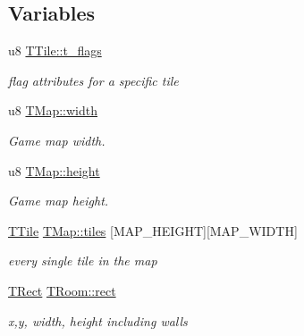 \subsection*{Variables}
\begin{DoxyCompactItemize}
\item 
\mbox{\label{group__GameMap_ga4e29a9a98bfa352440b628a995cba64d}} 
u8 \mbox{\hyperlink{group__GameMap_ga4e29a9a98bfa352440b628a995cba64d}{T\+Tile\+::t\+\_\+flags}}
\begin{DoxyCompactList}\small\item\em flag attributes for a specific tile \end{DoxyCompactList}\item 
\mbox{\label{group__GameMap_ga2fe3dde5db57e2ec58a78ceb85ef1642}} 
u8 \mbox{\hyperlink{group__GameMap_ga2fe3dde5db57e2ec58a78ceb85ef1642}{T\+Map\+::width}}
\begin{DoxyCompactList}\small\item\em Game map width. \end{DoxyCompactList}\item 
\mbox{\label{group__GameMap_ga62f0d660273fafe5b4f27ecc7f95456d}} 
u8 \mbox{\hyperlink{group__GameMap_ga62f0d660273fafe5b4f27ecc7f95456d}{T\+Map\+::height}}
\begin{DoxyCompactList}\small\item\em Game map height. \end{DoxyCompactList}\item 
\mbox{\label{group__GameMap_gac8050f8f059101f93288d8f4037531c9}} 
\mbox{\hyperlink{structTTile}{T\+Tile}} \mbox{\hyperlink{group__GameMap_gac8050f8f059101f93288d8f4037531c9}{T\+Map\+::tiles}} \mbox{[}M\+A\+P\+\_\+\+H\+E\+I\+G\+HT\mbox{]}\mbox{[}M\+A\+P\+\_\+\+W\+I\+D\+TH\mbox{]}
\begin{DoxyCompactList}\small\item\em every single tile in the map \end{DoxyCompactList}\item 
\mbox{\label{group__GameMap_ga637db7778f278eaa8fd09ec009881ae2}} 
\mbox{\hyperlink{structTRect}{T\+Rect}} \mbox{\hyperlink{group__GameMap_ga637db7778f278eaa8fd09ec009881ae2}{T\+Room\+::rect}}
\begin{DoxyCompactList}\small\item\em x,y, width, height including walls \end{DoxyCompactList}\item 

\end{DoxyCompactItemize}
